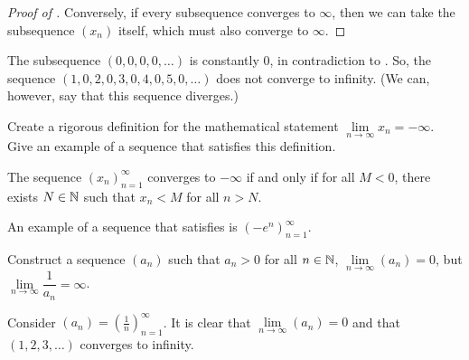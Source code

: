 \begin{problem}
\begin{enumerate}[label=(\alph*)]
\begin{proof}[Proof of ]
          Conversely, if every subsequence converges to $\infty$, then we can take the
          subsequence $(x_{n})$ itself, which must also converge to $\infty$.
        \end{proof}

        The subsequence $(0, 0, 0, 0, \ldots)$ is constantly $0$, in contradiction to 
        . So,
        the sequence $(1, 0, 2, 0, 3, 0, 4, 0, 5, 0, \ldots)$ does not converge 
        to infinity. (We can, however, say that this sequence diverges.)

  \end{enumerate}
\end{problem}

\begin{problem}
  Create a rigorous definition for the mathematical statement 
  $\lim\limits_{n \to \infty} x_{n} = -\infty$. Give an example of a 
  sequence that satisfies this definition. 

    \begin{definition}
      \label{def:convergence-to-neg-infty}
      The sequence $(x_{n})_{n=1}^{\infty}$ converges to $-\infty$ if and only if
      for all $M < 0$, there exists $N \in \mathbb{N}$ such that $x_{n} < M$ 
      for all $n > N$.
    \end{definition}

    An example of a sequence that satisfies  is
    $(-e^{n})_{n=1}^{\infty}$.
\end{problem}

\begin{problem}
  Construct a sequence $(a_{n})$ such that $a_{n} > 0$ for all $n \in \mathbb{N}$,
  $\lim\limits_{n \to \infty} (a_{n}) = 0$, but
  $\lim\limits_{n \to \infty} \dfrac{1}{a_{n}} = \infty$.

  \vspace{\baselineskip}

    Consider $(a_{n}) = \left( \frac{1}{n} \right)_{n=1}^{\infty}$. It is clear that
    $\lim\limits_{n \to \infty} (a_{n}) = 0$ and that $(1, 2, 3, \ldots)$ converges to infinity.

\end{problem}

